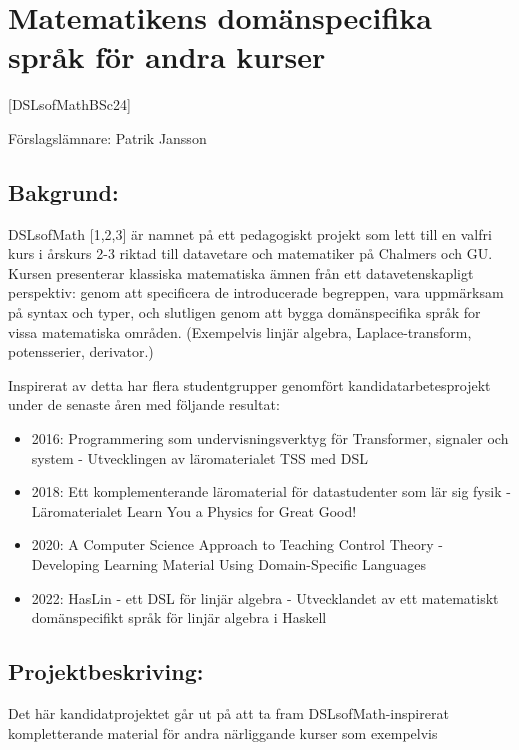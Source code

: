 \documentclass{article}
\author{}
\date{}
\providecommand{\tightlist}{%
  \setlength{\itemsep}{0pt}\setlength{\parskip}{0pt}}
\begin{document}
\section{Matematikens domänspecifika språk för andra kurser}\label{dslsofmath-matematikens-domuxe4nspecifika-spruxe5k-fuxf6r-andra-kurser}
[DSLsofMathBSc24]

Förslagslämnare: Patrik Jansson

\subsection{Bakgrund:}\label{bakgrund}

DSLsofMath {[}1,2,3{]} är namnet på ett pedagogiskt projekt som lett
till en valfri kurs i årskurs 2-3 riktad till datavetare och matematiker
på Chalmers och GU. Kursen presenterar klassiska matematiska ämnen från
ett datavetenskapligt perspektiv: genom att specificera de introducerade
begreppen, vara uppmärksam på syntax och typer, och slutligen genom att
bygga domänspecifika språk for vissa matematiska områden. (Exempelvis
linjär algebra, Laplace-transform, potensserier, derivator.)

Inspirerat av detta har flera studentgrupper genomfört
kandidatarbetesprojekt under de senaste åren med följande resultat:

\begin{itemize}
\tightlist
\item
  2016: Programmering som undervisningsverktyg för Transformer, signaler
  och system - Utvecklingen av läromaterialet TSS med DSL
\item
  2018: Ett komplementerande läromaterial för datastudenter som lär sig
  fysik - Läromaterialet Learn You a Physics for Great Good!
\item
  2020: A Computer Science Approach to Teaching Control Theory -
  Developing Learning Material Using Domain-Specific Languages
\item
  2022: HasLin - ett DSL för linjär algebra - Utvecklandet av ett
  matematiskt domänspecifikt språk för linjär algebra i Haskell
\end{itemize}

\subsection{Projektbeskriving:}\label{projektbeskriving}

Det här kandidatprojektet går ut på att ta fram DSLsofMath-inspirerat
kompletterande material för andra närliggande kurser som exempelvis
\end{document}
